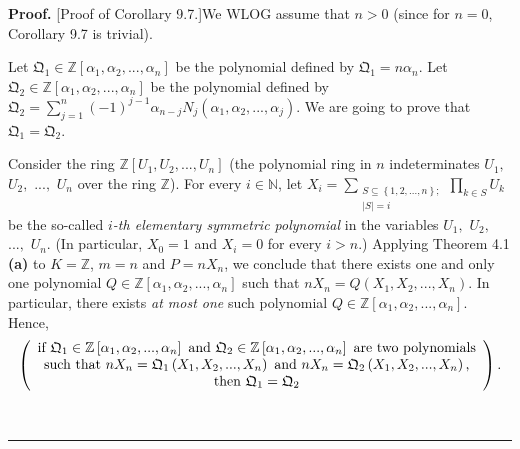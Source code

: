 \documentclass[numbers=enddot,12pt,final,onecolumn,notitlepage]{scrartcl}%
\newenvironment{proof}[1][Proof]{\noindent\textbf{#1.} }{\ \rule{0.5em}{0.5em}}
\begin{document}
\begin{proof}
[Proof of Corollary 9.7.]We WLOG assume that $n>0$ (since for $n=0$, Corollary
9.7 is trivial).

Let $\mathfrak{Q}_{1}\in\mathbb{Z}\left[  \alpha_{1},\alpha_{2},...,\alpha
_{n}\right]  $ be the polynomial defined by $\mathfrak{Q}_{1}=n\alpha_{n}$.
Let $\mathfrak{Q}_{2}\in\mathbb{Z}\left[  \alpha_{1},\alpha_{2},...,\alpha
_{n}\right]  $ be the polynomial defined by $\mathfrak{Q}_{2}=\sum
\limits_{j=1}^{n}\left(  -1\right)  ^{j-1}\alpha_{n-j}N_{j}\left(  \alpha
_{1},\alpha_{2},...,\alpha_{j}\right)  $. We are going to prove that
$\mathfrak{Q}_{1}=\mathfrak{Q}_{2}$.

Consider the ring $\mathbb{Z}\left[  U_{1},U_{2},...,U_{n}\right]  $ (the
polynomial ring in $n$ indeterminates $U_{1},$ $U_{2},$ $...,$ $U_{n}$ over
the ring $\mathbb{Z}$). For every $i\in\mathbb{N}$, let $X_{i}=\sum
\limits_{\substack{S\subseteq\left\{  1,2,...,n\right\}  ;\\\left\vert
S\right\vert =i}}\prod\limits_{k\in S}U_{k}$ be the so-called $i$\textit{-th
elementary symmetric polynomial} in the variables $U_{1},$ $U_{2},$ $...,$
$U_{n}$. (In particular, $X_{0}=1$ and $X_{i}=0$ for every $i>n$.) Applying
Theorem 4.1 \textbf{(a)} to $K=\mathbb{Z}$, $m=n$ and $P=nX_{n}$, we conclude
that there exists one and only one polynomial $Q\in\mathbb{Z}\left[
\alpha_{1},\alpha_{2},...,\alpha_{n}\right]  $ such that $nX_{n}=Q\left(
X_{1},X_{2},...,X_{n}\right)  $. In particular, there exists \textit{at most
one} such polynomial $Q\in\mathbb{Z}\left[  \alpha_{1},\alpha_{2}%
,...,\alpha_{n}\right]  $. Hence,
\begin{equation}
\left(
\begin{array}
[c]{c}%
\text{if }\mathfrak{Q}_{1}\in\mathbb{Z}\left[  \alpha_{1},\alpha
_{2},...,\alpha_{n}\right]  \text{ and }\mathfrak{Q}_{2}\in\mathbb{Z}\left[
\alpha_{1},\alpha_{2},...,\alpha_{n}\right]  \text{ are two polynomials}\\
\text{such that }nX_{n}=\mathfrak{Q}_{1}\left(  X_{1},X_{2},...,X_{n}\right)
\text{ and }nX_{n}=\mathfrak{Q}_{2}\left(  X_{1},X_{2},...,X_{n}\right)
\text{,}\\
\text{then }\mathfrak{Q}_{1}=\mathfrak{Q}_{2}%
\end{array}
\right)  . \label{9.7.pf1}%
\end{equation}



\end{proof}
\end{document}
